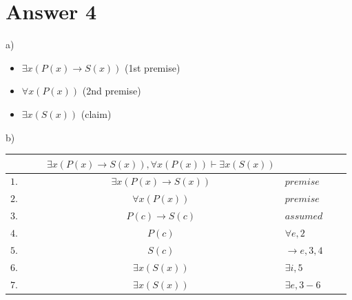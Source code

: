 \documentclass[12pt]{article}
\begin{document}
\section*{Answer 4}
\hspace {5mm} a)\\
\begin{itemize}
\centering
	\item $\exists x (P(x) \rightarrow S(x)) $ (1st premise)\\
	\item $\forall x (P(x))$ (2nd premise) \\
	\item $\exists x (S(x))$ (claim) \\
\end{itemize}
\hspace {5mm} b)\\
\begin{table}[H]
    \centering
    \begin{tabular}{lllclrr}
        & & & $\exists x (P(x) \rightarrow S(x)), \forall x (P(x)) \vdash \exists x (S(x)) $ & & & \\
        \hline
        \hline
        $1.$ & & & $\exists x (P(x) \rightarrow S(x)) $ & $premise$ & & \\
        $2.$ & & & $\forall x (P(x)) $ & $premise$ & & \\
        \cline{2-7}
        $3.$ & \multicolumn{1}{|c}{} & & $P(c) \rightarrow S(c)$ & $assumed$ & & \multicolumn{1}{c|}{} \\
        $4.$ & \multicolumn{1}{|c}{} & & $P(c)$ & $\forall e, 2$ & & \multicolumn{1}{c|}{} \\
        $5.$ & \multicolumn{1}{|c}{} & & $S(c)$ & $\rightarrow e, 3,4$ & & \multicolumn{1}{c|}{} \\
        $6.$ & \multicolumn{1}{|c}{} & & $\exists x (S(x))$ & $\exists i, 5$ & & \multicolumn{1}{c|}{} \\
        \cline{2-7}
        $7.$ & & & $\exists x (S(x)) $ & $\exists e, 3-6$ & & \\
    \end{tabular}
\end{table}
\end{document}
